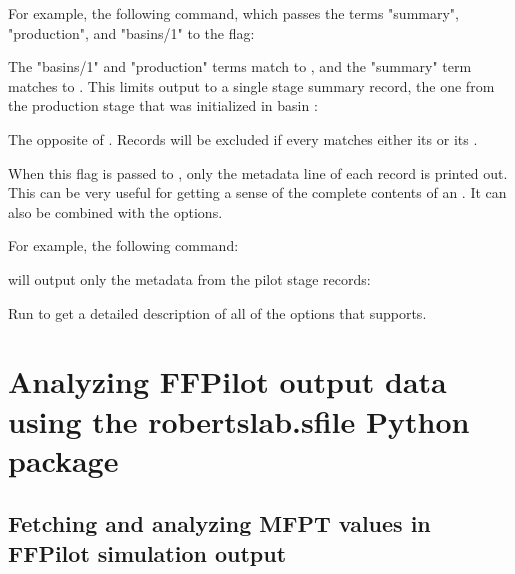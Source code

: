 {\begin{description}[style=nextline]
        For example, the following  command, which passes the terms "summary", \\"production", and "basins/1"  to the  flag:
        
        
        The "basins/1" and "production" terms match to , and the "summary" term matches to . This limits output to a single stage summary record, the one from the production stage that was initialized in basin  :
        
    
    \item[\code{-e/--exclude <pattern0> <pattern1> ...}]
        The opposite of . Records will be excluded if every  matches either its  or its .
    
    \item[\code{-l/--list-only}]
        When this flag is passed to , only the metadata line of each record is printed out. This can be very useful for getting a sense of the complete contents of an . It can also be combined with the  options.
        
        For example, the following command:
        
        
        will output only the metadata from the pilot stage records:
        
        
\end{description}

Run  to get a detailed description of all of the options that  supports.

\section{Analyzing FFPilot output data using the robertslab.sfile Python package}

\subsection{Fetching and analyzing MFPT values in FFPilot simulation output}\label{sec:fetch_mfpt_srg}

}
